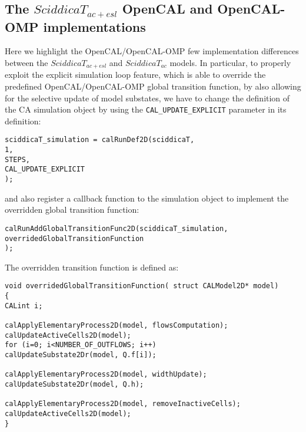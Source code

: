 \subsection{The $SciddicaT_{ac+esl}$ OpenCAL and OpenCAL-OMP implementations}
Here we highlight the OpenCAL/OpenCAL-OMP few implementation
differences between the $SciddicaT_{ac+esl}$ and $SciddicaT_{ac}$
models. In particular, to properly exploit the explicit simulation
loop feature, which is able to override the predefined
OpenCAL/OpenCAL-OMP global transition function, by also allowing
for the selective update of model substates, we have to change the
definition of the CA simulation object by using the
\verb'CAL_UPDATE_EXPLICIT' parameter in its definition:
\begin{lstlisting}[basicstyle=\footnotesize, numbers=none]
sciddicaT_simulation = calRunDef2D(sciddicaT,
1,
STEPS,
CAL_UPDATE_EXPLICIT
);
\end{lstlisting}

\noindent and also register a callback function to the simulation object to
implement the overridden global transition function:

\begin{lstlisting}[basicstyle=\footnotesize, numbers=none]
calRunAddGlobalTransitionFunc2D(sciddicaT_simulation,
overridedGlobalTransitionFunction
);
\end{lstlisting}

\noindent The overridden transition function is defined as:
\begin{lstlisting}[basicstyle=\footnotesize, numbers=none]
void overridedGlobalTransitionFunction( struct CALModel2D* model)
{
CALint i;

calApplyElementaryProcess2D(model, flowsComputation);
calUpdateActiveCells2D(model);
for (i=0; i<NUMBER_OF_OUTFLOWS; i++)
calUpdateSubstate2Dr(model, Q.f[i]);

calApplyElementaryProcess2D(model, widthUpdate);
calUpdateSubstate2Dr(model, Q.h);

calApplyElementaryProcess2D(model, removeInactiveCells);
calUpdateActiveCells2D(model);
}
\end{lstlisting}


